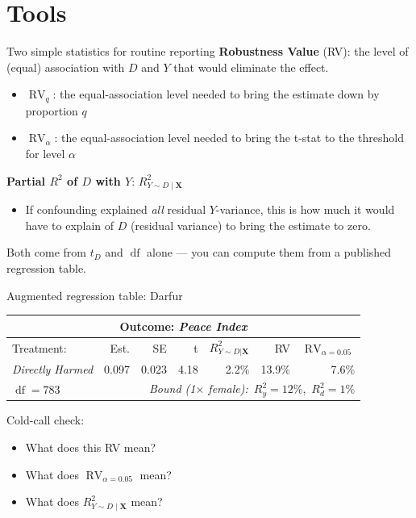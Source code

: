 \documentclass[xcolor=dvipsnames]{beamer}
\newcommand\X{{\bm X}}
\DeclareMathOperator{\df}{df}
\DeclareMathOperator{\rv}{RV}
\begin{document}
\section{Tools}

\begin{frame}{Two simple statistics for routine reporting}
\small
{} \textbf{Robustness Value} (RV): the level of (equal) association with $D$ and $Y$ that would eliminate the effect.
\begin{itemize}
\item<2-> $\rv_{q}$: the equal-association level needed to bring the estimate down by proportion $q$
\item<3-> $\rv_{\alpha}$: the equal-association level needed to bring the t-stat to the threshold for level $\alpha$
\end{itemize}
\medskip
{} \textbf{Partial $R^2$ of $D$ with $Y$}: $R^2_{Y\sim D \mid \X}$
\begin{itemize}
\item<5-> If confounding explained \textit{all} residual $Y$-variance, this is how much it would have to explain of $D$ (residual variance) to bring the estimate to zero.
\end{itemize}
\medskip
{} Both come from $t_D$ and $\df$ alone --- you can compute them from a published regression table.
\end{frame}


\begin{frame}{Augmented regression table: Darfur}
\footnotesize
\begin{table}[!h] \centering
\begin{tabular}{lrrrrrr}
\multicolumn{7}{c}{Outcome: \textit{Peace Index}} \\
\hline\hline
Treatment: & Est. & SE & t & $R^2_{Y\sim D|\X}$ & RV & $\rv_{\alpha=0.05}$ \\
\hline
\textit{Directly Harmed} & 0.097 & 0.023 & 4.18 & 2.2\% & 13.9\% & 7.6\% \\
\hline
$\df = 783$ & & \multicolumn{5}{r}{\small \textit{Bound (1$\times$ female):}\ $R^2_y = 12\%$,\ $R^2_d = 1\%$}
\end{tabular}
\end{table}

\medskip
Cold-call check:
\begin{itemize}
\item What does this RV mean?
\item What does $\rv_{\alpha=0.05}$ mean?
\item What does $R^2_{Y\sim D \mid \X}$ mean?
\end{itemize}
\end{frame}
\end{document}
